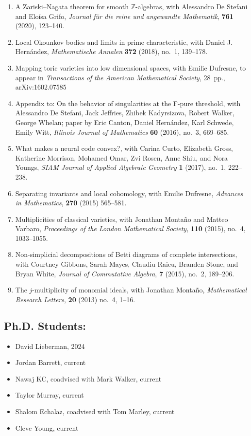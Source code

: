 \documentclass[12pt]{amsart}
\newcommand{\N}{}
\begin{document}
\begin{enumerate}[leftmargin=9mm]
\item A Zariski--Nagata theorem for smooth $\mathbb{Z}$-algebras, with Alessandro De Stefani and Elo\'isa Grifo, \emph{Journal für die reine und angewandte Mathematik}, \textbf{761} (2020), 123--140. \N
\item Local Okounkov bodies and limits in prime characteristic, with Daniel J. Hern\'andez, \emph{Mathematische Annalen} \textbf{372} (2018), no.~1, 139--178.
\item Mapping toric varieties into low dimensional spaces, with Emilie Dufresne, to appear in \emph{Transactions of the American Mathematical Society}, 28~pp., arXiv:1602.07585
\item Appendix to: On the behavior of singularities at the F-pure threshold, with Alessandro De Stefani, Jack Jeffries, Zhibek Kadyrsizova, Robert Walker, George Whelan; paper by Eric Canton, Daniel Hern\'andez, Karl Schwede, Emily Witt, \emph{Illinois Journal of Mathematics} \textbf{60} (2016), no.~3, 669--685.
\item What makes a neural code convex?, with Carina Curto, Elizabeth Gross, Katherine Morrison, Mohamed Omar, Zvi Rosen, Anne Shiu, and Nora Youngs, \emph{SIAM Journal of Applied Algebraic Geometry} \textbf{1} (2017), no.~1, 222--238.
\item Separating invariants and local cohomology, with Emilie Dufresne, \emph{Advances in Mathematics}, \textbf{270} (2015) 565--581.
\item \sloppy Multiplicities of classical varieties, with Jonathan Monta\~no and Matteo Varbaro, \emph{Proceedings of the London Mathematical Society}, {\bf 110} (2015), no.~4, 1033--1055.
\item Non-simplicial decompositions of Betti diagrams of complete intersections, with Courtney Gibbons, Sarah Mayes, Claudiu Raicu, Branden Stone, and Bryan White, \emph{Journal of Commutative Algebra}, \textbf{7} (2015), no.~2, 189--206.
\item The $j$-multiplicity of monomial ideals, with Jonathan Monta\~no, \emph{Mathematical Research Letters}, {\bf 20} (2013) no.~4, 1--16.



\end{enumerate}



\subsection*{Ph.D. Students:}
\begin{itemize}[leftmargin=9mm]
	\item David Lieberman, 2024
	\item Jordan Barrett, current
	\item Nawaj KC, coadvised with Mark Walker, current
	\item Taylor Murray, current
	\item Shalom Echalaz, coadvised with Tom Marley, current
	\item Cleve Young, current
	\end{itemize}
\end{document}
